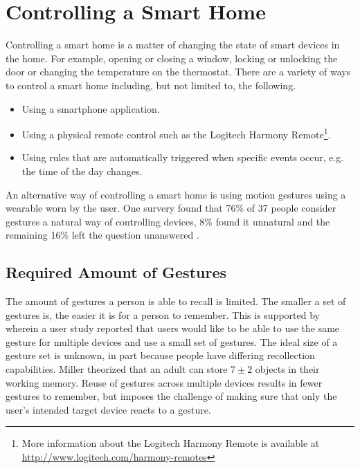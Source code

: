 \section{Controlling a Smart Home}
\label{sec:introduction:gesture-control}

Controlling a smart home is a matter of changing the state of smart devices in the home. For example, opening or closing a window, locking or unlocking the door or changing the temperature on the thermostat. There are a variety of ways to control a smart home including, but not limited to, the following.

\begin{itemize}
\item Using a smartphone application.
\item Using a physical remote control such as the Logitech Harmony Remote\footnote{More information about the Logitech Harmony Remote is available at \url{http://www.logitech.com/harmony-remotes}}.
\item Using rules that are automatically triggered when specific events occur, e.g. the time of the day changes.
\end{itemize}

An alternative way of controlling a smart home is using motion gestures using a wearable worn by the user. One survery found that 76\% of 37 people consider gestures a natural way of controlling devices, 8\% found it unnatural and the remaining 16\% left the question unanswered \cite{Kela2006}.

\subsection{Required Amount of Gestures}

The amount of gestures a person is able to recall is limited. The smaller a set of gestures is, the easier it is for a person to remember. This is supported by \cite{Kela2006} wherein a user study reported that users would like to be able to use the same gesture for multiple devices and use a small set of gestures.
The ideal size of a gesture set is unknown, in part because people have differing recollection capabilities. Miller \cite{miller1956magical} theorized that an adult can store $7 \pm 2$ objects in their working memory.
Reuse of gestures across multiple devices results in fewer gestures to remember, but imposes the challenge of making sure that only the user's intended target device reacts to a gesture.

